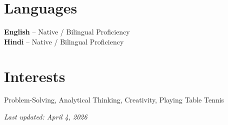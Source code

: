 \documentclass[letterpaper,11pt]{article}
\begin{document}
\section{Languages}
 \begin{itemize}[leftmargin=0.15in, label={}]
    \small{\item{
     \textbf{English} -- Native / Bilingual Proficiency \\
     \textbf{Hindi} -- Native / Bilingual Proficiency
    }}
 \end{itemize}

\section{Interests}
 \begin{itemize}[leftmargin=0.15in, label={}]
    \small{\item{
     Problem-Solving, Analytical Thinking, Creativity, Playing Table Tennis
    }}
 \end{itemize}

\vfill
\begin{center}
    \small\textit{Last updated: April 4, 2026}
\end{center}
\end{document}
